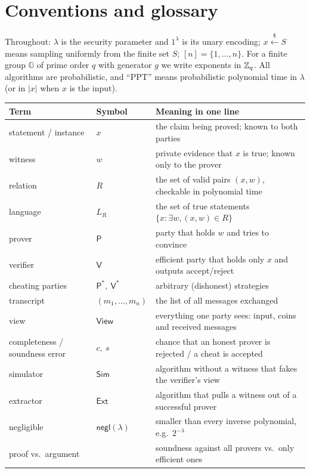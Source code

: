 \documentclass[11pt,a4paper]{report}
\theoremstyle{plain}
\theoremstyle{definition}
\theoremstyle{remark}
\newcommand{\GG}{\mathbb{G}}
\newcommand{\getsr}{\xleftarrow{\$}}
\newcommand{\negl}{\mathsf{negl}}
\newcommand{\PPT}{\mathrm{PPT}}
\newcommand{\Prv}{\mathsf{P}}\newcommand{\Ver}{\mathsf{V}}
\newcommand{\Sim}{\mathsf{Sim}}\newcommand{\Ext}{\mathsf{Ext}}
\newcommand{\view}{\mathsf{View}}
\begin{document}
\section{Conventions and glossary}
Throughout: $\lambda$ is the security parameter and $1^\lambda$ is its unary encoding; $x\getsr S$ means sampling uniformly from the finite set $S$; $[n]=\{1,\dots,n\}$. For a finite group $\GG$ of prime order $q$ with generator $g$ we write exponents in $\mathbb{Z}_q$. All algorithms are probabilistic, and ``$\PPT$'' means probabilistic polynomial time in $\lambda$ (or in $|x|$ when $x$ is the input).

\begin{center}
\renewcommand{\arraystretch}{1.2}
\begin{tabular}{@{}L{3.0cm} L{3.0cm} L{8.2cm}@{}}
\toprule
\textbf{Term} & \textbf{Symbol} & \textbf{Meaning in one line}\\
\midrule
statement / instance & $x$ & the claim being proved; known to both parties\\
witness & $w$ & private evidence that $x$ is true; known only to the prover\\
relation & $R$ & the set of valid pairs $(x,w)$, checkable in polynomial time\\
language & $L_R$ & the set of true statements $\{x:\exists w,(x,w)\in R\}$\\
prover & $\Prv$ & party that holds $w$ and tries to convince\\
verifier & $\Ver$ & efficient party that holds only $x$ and outputs accept/reject\\
cheating parties & $\Prv^*,\ \Ver^*$ & arbitrary (dishonest) strategies\\
transcript & $(m_1,\dots,m_n)$ & the list of all messages exchanged\\
view & $\view$ & everything one party sees: input, coins and received messages\\
completeness / soundness error & $c,\ s$ & chance that an honest prover is rejected / a cheat is accepted\\
simulator & $\Sim$ & algorithm without a witness that fakes the verifier's view\\
extractor & $\Ext$ & algorithm that pulls a witness out of a successful prover\\
negligible & $\negl(\lambda)$ & smaller than every inverse polynomial, e.g.\ $2^{-\lambda}$\\
proof vs.\ argument & & soundness against all provers vs.\ only efficient ones\\
\bottomrule
\end{tabular}
\end{center}
\end{document}
